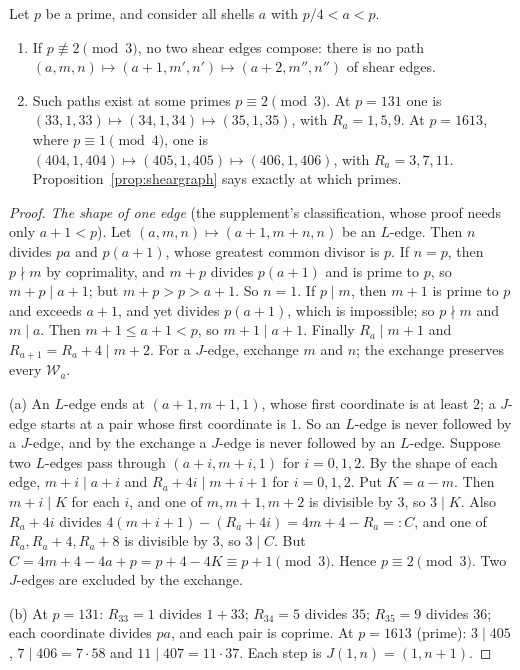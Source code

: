 \begin{proposition}\label{prop:twoshears}
Let $p$ be a prime, and consider all shells $a$ with $p/4<a<p$.
\begin{enumerate}[label=(\alph*)]
\item If $p\not\equiv2\pmod3$, no two shear edges compose: there is no path $(a,m,n)\mapsto(a+1,m',n')\mapsto(a+2,m'',n'')$ of shear edges.
\item Such paths exist at some primes $p\equiv2\pmod3$. At $p=131$ one is $(33,1,33)\mapsto(34,1,34)\mapsto(35,1,35)$, with $R_a=1,5,9$. At $p=1613$, where $p\equiv1\pmod4$, one is $(404,1,404)\mapsto(405,1,405)\mapsto(406,1,406)$, with $R_a=3,7,11$. Proposition~\ref{prop:sheargraph} says exactly at which primes.
\end{enumerate}
\end{proposition}
\begin{proof}
\emph{The shape of one edge} (the supplement's classification, whose proof needs only $a+1<p$). Let $(a,m,n)\mapsto(a+1,m+n,n)$ be an $L$-edge. Then $n$ divides $pa$ and $p(a+1)$, whose greatest common divisor is $p$. If $n=p$, then $p\nmid m$ by coprimality, and $m+p$ divides $p(a+1)$ and is prime to $p$, so $m+p\mid a+1$; but $m+p>p>a+1$. So $n=1$. If $p\mid m$, then $m+1$ is prime to $p$ and exceeds $a+1$, and yet divides $p(a+1)$, which is impossible; so $p\nmid m$ and $m\mid a$. Then $m+1\le a+1<p$, so $m+1\mid a+1$. Finally $R_a\mid m+1$ and $R_{a+1}=R_a+4\mid m+2$. For a $J$-edge, exchange $m$ and $n$; the exchange preserves every $\mathcal W_a$.

(a) An $L$-edge ends at $(a+1,m+1,1)$, whose first coordinate is at least $2$; a $J$-edge starts at a pair whose first coordinate is $1$. So an $L$-edge is never followed by a $J$-edge, and by the exchange a $J$-edge is never followed by an $L$-edge. Suppose two $L$-edges pass through $(a+i,m+i,1)$ for $i=0,1,2$. By the shape of each edge, $m+i\mid a+i$ and $R_a+4i\mid m+i+1$ for $i=0,1,2$. Put $K=a-m$. Then $m+i\mid K$ for each $i$, and one of $m,m+1,m+2$ is divisible by $3$, so $3\mid K$. Also $R_a+4i$ divides $4(m+i+1)-(R_a+4i)=4m+4-R_a=:C$, and one of $R_a,R_a+4,R_a+8$ is divisible by $3$, so $3\mid C$. But $C=4m+4-4a+p=p+4-4K\equiv p+1\pmod3$. Hence $p\equiv2\pmod3$. Two $J$-edges are excluded by the exchange.

(b) At $p=131$: $R_{33}=1$ divides $1+33$; $R_{34}=5$ divides $35$; $R_{35}=9$ divides $36$; each coordinate divides $pa$, and each pair is coprime. At $p=1613$ (prime): $3\mid405$, $7\mid406=7\cdot58$ and $11\mid407=11\cdot37$. Each step is $J(1,n)=(1,n+1)$.
\end{proof}

